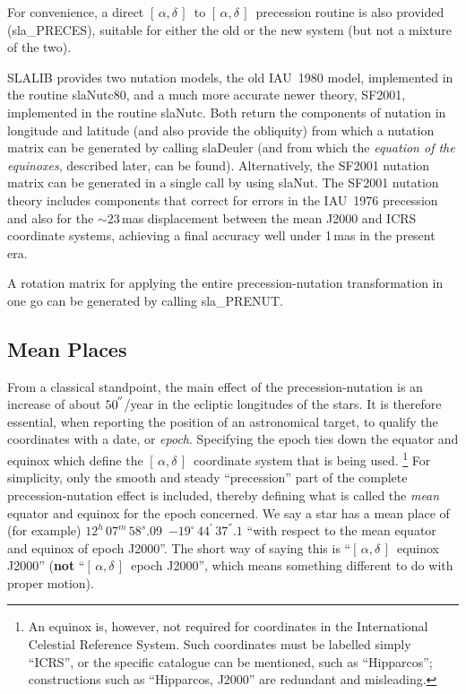 \documentclass[11pt,twoside]{article}
\newcommand{\radec}     {$[\,\alpha,\delta\,]$}
\newcommand{\arcsec}[2] {\arcseci{#1}$\hspace{-0.4em}.#2$}
\newcommand{\arcsec}[2] {
      {$#1\hspace{-0.05em}^{'\hspace{-0.1em}'}\hspace{-0.4em}.#2$}
   }
\newcommand{\arcseci}[1] {$#1\hspace{-0.05em}$\raisebox{-0.5ex}
                         {$^{'\hspace{-0.1em}'}$}}
\renewcommand{\arcseci}[1] {$#1\hspace{-0.05em}^{'\hspace{-0.1em}'}$}
\newcommand{\dms}[4]    {$#1^{\circ}\,#2\raisebox{-0.5ex}
                        {$^{'}$}\,$\arcsec{#3}{#4}}
\renewcommand{\dms}[4]{$#1^{\circ}\,#2^{'}\,#3^{''}.#4$}
\newcommand{\tseci}[1]   {$#1$\mbox{$^{\rm s}$}}
\newcommand{\tsec}[2]    {\tseci{#1}$\hspace{-0.3em}.#2$}
\renewcommand{\tsec}[2] {$#1^{\rm s}\hspace{-0.3em}.#2$}
\newcommand{\hms}[4]    {$#1^{\rm h}\,#2^{\rm m}\,$\tsec{#3}{#4}}
\renewcommand{\hms}[4] {$#1^{h}\,#2^{m}\,#3^{s}.#4$}
\begin{document}
For convenience, a direct \radec\ to \radec\ precession routine is
also provided
(sla\_PRECES),
suitable for either the old or the new system (but not a
mixture of the two).

SLALIB provides two nutation models, the old IAU~1980 model,
implemented in the routine
slaNutc80, and a much more accurate newer theory, SF2001,
implemented in the routine
slaNutc.
Both return the components of nutation
in longitude and latitude (and also provide the obliquity) from
which a nutation matrix can be generated by calling
slaDeuler
(and from which the {\it equation of the equinoxes}, described
later, can be found).  Alternatively,
the SF2001 nutation matrix can be generated in a single call by using
slaNut.  The SF2001 nutation theory includes components that correct
for errors in the IAU~1976 precession and also for the
$\sim 23\,$mas
displacement between the mean J2000 and ICRS coordinate systems,
achieving a final accuracy well under 1\,mas in the present era.

A rotation matrix for applying the entire precession-nutation
transformation in one go can be generated by calling
sla\_PRENUT.

\subsection{Mean Places}
From a classical standpoint,
the main effect of the precession-nutation is an increase of about
\arcseci{50}/year in the ecliptic longitudes of the stars.  It is therefore
essential, when reporting the position of an astronomical target, to
qualify the coordinates with a date, or {\it epoch}.
Specifying the epoch ties down the equator and
equinox which define the \radec\ coordinate system that is
being used.
\footnote{An equinox is, however, not required for coordinates
in the International Celestial Reference System.  Such coordinates must
be labelled simply ``ICRS'', or the specific catalogue can be mentioned,
such as ``Hipparcos'';  constructions such as ``Hipparcos, J2000'' are
redundant and misleading.}  For simplicity, only
the smooth and steady ``precession'' part of the
complete precession-nutation effect is
included, thereby defining what is called the {\it mean}\/
equator and equinox for the epoch concerned.  We say a star
has a mean place of (for example)
\hms{12}{07}{58}{09}~\dms{-19}{44}{37}{1} ``with respect to the mean equator
and equinox of epoch J2000''.  The short way of saying
this is ``\radec\ equinox J2000'' ({\bf not} ``\radec\ epoch J2000'',
which means something different to do with
proper motion).
\end{document}

